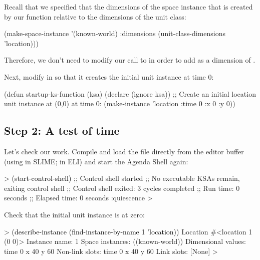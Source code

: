 \documentclass[10pt,twoside,english,pdftex]{article}
\begin{document}
Recall that we specified that the dimensions of the  space
instance that is created by our  function relative to
the dimensions of the  unit class:
%
\begin{example}\color{darkergray}%
    (make-space-instance 
        '(known-world)
        :dimensions (unit-class-dimensions 'location)))
\end{example}
%
Therefore, we don't need to modify our call to  in
order to add  as a dimension of .

Next, modify  in  so
that it creates the initial  unit instance at time 0:
%
\begin{example}\color{darkergray}%
  (defun startup-ks-function (ksa)
    (declare (ignore ksa))
    ;; Create an initial location unit instance at (0,0) \textcolor{black}{at time 0}:
    (make-instance 'location \textcolor{black}{:time 0} :x 0 :y 0))
\end{example}

\subsection*{Step 2: A test of time}

Let's check our work.  Compile and load the
 file directly from the editor buffer (using
 in SLIME;  in ELI) and start the Agenda Shell
again:
%
\begin{example}\color{darkergray}%
  > \textcolor{black}{(start-control-shell)}
  ;; Control shell started
  ;; No executable KSAs remain, exiting control shell
  ;; Control shell exited: 3 cycles completed
  ;; Run time: 0 seconds
  ;; Elapsed time: 0 seconds
  :quiescence
  >
\end{example}

%
%
Check that the initial  unit instance is at  zero:
%
\begin{example}\color{darkergray}%
  > \textcolor{black}{(describe-instance (find-instance-by-name 1 'location))}
  Location #<location 1 (0 0)>
    Instance name: 1
    Space instances: ((known-world))
    Dimensional values:
      time 0
      x 40
      y 60
    Non-link slots:
      time 0
      x 40
      y 60
    Link slots:
      [None]
  >
\end{example}
\end{document}
